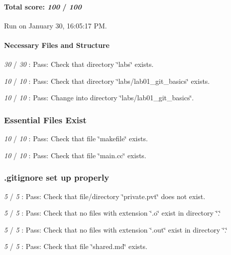\paragraph*{Total score\+: {\itshape 100} / {\itshape 100}}

Run on January 30, 16\+:05\+:17 PM.

\paragraph*{Necessary Files and Structure}


\begin{DoxyItemize}
\item {\itshape 30} / {\itshape 30} \+: Pass\+: Check that directory \char`\"{}labs\char`\"{} exists.
\item {\itshape 10} / {\itshape 10} \+: Pass\+: Check that directory \char`\"{}labs/lab01\+\_\+git\+\_\+basics\char`\"{} exists.
\item {\itshape 10} / {\itshape 10} \+: Pass\+: Change into directory \char`\"{}labs/lab01\+\_\+git\+\_\+basics\char`\"{}.
\end{DoxyItemize}

\subsubsection*{Essential Files Exist}


\begin{DoxyItemize}
\item {\itshape 10} / {\itshape 10} \+: Pass\+: Check that file \char`\"{}makefile\char`\"{} exists.
\item {\itshape 10} / {\itshape 10} \+: Pass\+: Check that file \char`\"{}main.\+cc\char`\"{} exists.
\end{DoxyItemize}

\subsubsection*{.gitignore set up properly}


\begin{DoxyItemize}
\item {\itshape 5} / {\itshape 5} \+: Pass\+: Check that file/directory \char`\"{}private.\+pvt\char`\"{} does not exist.
\item {\itshape 5} / {\itshape 5} \+: Pass\+: Check that no files with extension \char`\"{}.\+o\char`\"{} exist in directory \char`\"{}.\char`\"{}
\item {\itshape 5} / {\itshape 5} \+: Pass\+: Check that no files with extension \char`\"{}.\+out\char`\"{} exist in directory \char`\"{}.\char`\"{}
\item {\itshape 5} / {\itshape 5} \+: Pass\+: Check that file \char`\"{}shared.\+md\char`\"{} exists.
\end{DoxyItemize}

